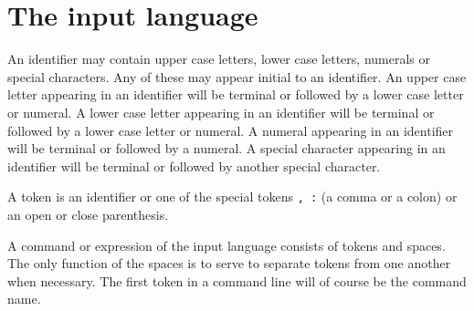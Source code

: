 \section{The input language}

An identifier may contain upper case letters, lower case letters, numerals or special characters.   Any of these may appear initial to an identifier.  An upper case letter appearing in an identifier
will be terminal or followed by a lower case letter or numeral.   A lower case letter appearing in an identifier will be terminal or followed by a lower case letter or numeral.   A numeral appearing in an identifier will be terminal or followed by a numeral.   A special character appearing in an identifier will be terminal or followed by another special character.

A token is an identifier or one of the special tokens {\tt , :} (a comma or a colon) or an open or close parenthesis.

A command or expression of the input language consists of tokens and spaces.  The only function of the spaces is to serve to separate tokens from one another when necessary.   The first token in a command line will of course be the command name.

